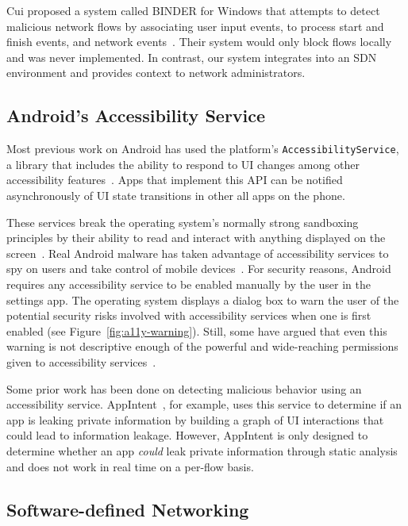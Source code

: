 Cui \etal proposed a system called BINDER for Windows that attempts to detect
malicious network flows by associating user input events, to process start and
finish events, and network events~\cite{cui2005}. Their system would only block
flows locally and was never implemented. In contrast, our system integrates
into an SDN environment and provides context to network administrators.


\subsection{Android's Accessibility Service}
\label{sec:androids-accessibility-service}

Most previous work on Android has used the platform's
\texttt{AccessibilityService}, a library that includes the ability to respond to
UI changes among other accessibility features~\cite{googledevelopers2020}. Apps
that implement this API can be notified asynchronously of UI state transitions
in other all apps on the phone.

These services break the operating system's normally strong sandboxing
principles by their ability to read and interact with anything displayed on the
screen~\cite{kalysch2018, diao2019}. Real Android malware has taken advantage of
accessibility services to spy on users and take control of mobile
devices~\cite{kraunelis2013}. For security reasons, Android requires any
accessibility service to be enabled manually by the user in the settings app.
The operating system displays a dialog box to warn the user of the potential
security risks involved with accessibility services when one is first enabled
(see Figure~\ref{fig:a11y-warning}). Still, some have argued that even this
warning is not descriptive enough of the powerful and wide-reaching permissions
given to accessibility services~\cite{kalysch2018}.

Some prior work has been done on detecting malicious behavior using an
accessibility service. AppIntent~\cite{yang2013}, for example, uses this service
to determine if an app is leaking private information by building a graph of UI
interactions that could lead to information leakage. However, AppIntent is only
designed to determine whether an app \textit{could} leak private information
through static analysis and does not work in real time on a per-flow basis.

\subsection{Software-defined Networking}
\label{sec:software-defined-networking}

